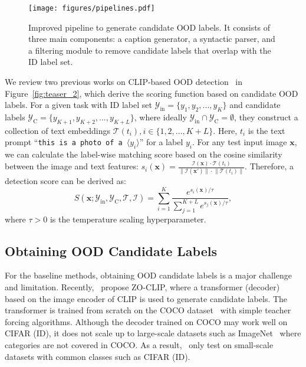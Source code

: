 \documentclass{article}
\def\*#1{\mathbf{#1}}
\begin{document}
\begin{figure*}[!t]
\centering
\texttt{[image: figures/pipelines.pdf]}
\caption{Improved pipeline to generate candidate OOD labels. It consists of three main components: a caption generator, a syntactic parser, and a filtering module to remove candidate labels that overlap with the ID label set.}
\label{fig:pipeline}
\end{figure*}



\label{sec:candidate_label}
We review two previous works on CLIP-based OOD detection~\cite{esmaeilpour2022zero,fort2021exploring} in Figure~\ref{fig:teaser_2}, which derive the scoring function based on candidate OOD labels. For a given task with ID label set $\mathcal{Y}_\text{in}=\{y_1, y_2,...,y_K\}$ and candidate labels $\mathcal{Y}_\text{C}=\{y_{K+1}, y_{K+2},...,y_{K+L}\}$, where ideally $\mathcal{Y}_\text{in}\cap \mathcal{Y}_\text{C} = \emptyset$, they construct a collection of text embeddings $\mathcal{T}(t_i), i\in \{1,2,...,K+L\}$. Here, $t_i$ is the text prompt ``\texttt{this is a photo of a $\langle y_i \rangle$}''
for a label $y_i$. For any test input image $\*x$, we can calculate the label-wise matching score based on the cosine similarity between the image and text features: $s_i(\*x) = \frac{\mathcal{I}(\*x) \cdot \mathcal{T}(t_i)}{\lVert \mathcal{I}(\*x')\rVert \cdot \lVert \mathcal{T}(t_i) \rVert}$.
Therefore, a detection score can be derived as:
\begin{equation*}
    S(\*x;\mathcal{Y}_\text{in},\mathcal{Y}_\text{C}, \mathcal{T},\mathcal{I}) = \sum_{i=1}^{K} \frac{ e^{s_i(\*x)/\tau}}{\sum_{j=1}^{K+L} e^{s_j(\*x)/\tau}},
\end{equation*}
where $\tau > 0$ is the temperature scaling hyperparameter. 

\subsection{Obtaining OOD Candidate Labels}
For the baseline methods, obtaining OOD candidate labels is a major challenge and limitation. Recently,~\cite{esmaeilpour2022zero} propose ZO-CLIP, where a transformer (decoder)  based on the image encoder of CLIP is used to generate candidate labels. The transformer is trained from scratch on the  COCO dataset~\cite{lin2014microsoft} with simple teacher forcing algorithms. Although the decoder trained on COCO may work well on CIFAR (ID), it does not scale up to large-scale datasets such as ImageNet~\cite{deng2009imagenet} where categories are not covered in COCO. As a result,~\cite{esmaeilpour2022zero} only test on small-scale datasets with common classes such as CIFAR (ID).
\end{document}
